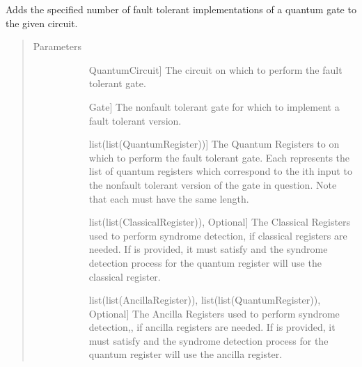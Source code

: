 \documentclass[letterpaper,10pt,english]{sphinxmanual}
\begin{document}
\begin{fulllineitems}
\begin{fulllineitems}
\label{\detokenize{Base:BaseFaultTolerance.FaultTolerantGates.addGateCircuit}}
\sphinxAtStartPar
Adds the specified number of fault tolerant implementations of a quantum gate to the given circuit.
\begin{quote}\begin{description}
\item[{Parameters}] \leavevmode\begin{description}
\item[{}] \leavevmode{[}QuantumCircuit{]}
\sphinxAtStartPar
The circuit on which to perform the fault tolerant gate.

\item[{}] \leavevmode{[}Gate{]}
\sphinxAtStartPar
The non\sphinxhyphen{}fault tolerant gate for which to implement a fault tolerant version.

\item[{}] \leavevmode{[}list(list(QuantumRegister)){]}
\sphinxAtStartPar
The Quantum Registers to on which to perform the fault tolerant gate. Each  represents the list of quantum registers which correspond to the ith input to the non\sphinxhyphen{}fault tolerant version of the gate in question. Note that each  must have the same length.

\item[{}] \leavevmode{[}list(list(ClassicalRegister)), Optional{]}
\sphinxAtStartPar
The Classical Registers used to perform syndrome detection, if classical registers are needed. If  is provided, it must satisfy  and the syndrome detection process for the  quantum register will use the  classical register.

\item[{}] \leavevmode{[}list(list(AncillaRegister)), list(list(QuantumRegister)), Optional{]}
\sphinxAtStartPar
The Ancilla Registers used to perform syndrome detection,, if ancilla registers are needed. If  is provided, it must satisfy  and the syndrome detection process for the  quantum register will use the  ancilla register.


\end{description}
\end{description}
\end{quote}
\end{fulllineitems}
\end{fulllineitems}
\end{document}
